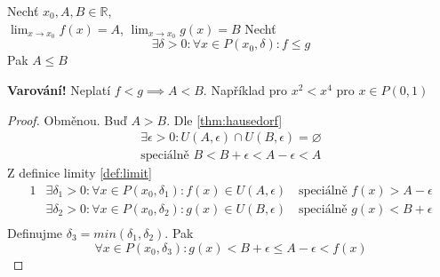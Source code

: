 \begin{theorem}
    Nechť $x_0, A, B\in\mathbb{R}$, \\
    $\lim_{x\to x_0}f(x)=A$, $\lim_{x\to x_0}g(x)=B$ Nechť
    \begin{equation}
        \exists\delta>0:\forall x\in P(x_0,\delta):f\leq g
    \end{equation}
    Pak $A\leq B$

    \textbf{Varování!} Neplatí $f<g\implies A<B$. Například pro $x^2<x^4 \text{ pro }x\in P(0,1)$
\end{theorem}
\begin{proof}
    Obměnou. Buď $A>B$. Dle \autoref{thm:hausedorf}
    \begin{gather}
        \exists\epsilon>0:U(A,\epsilon)\cap U(B,\epsilon)=\varnothing \\
        \text{speciálně }B<B+\epsilon<A-\epsilon<A
    \end{gather}
    Z definice limity \autoref{def:limit}
    \begin{alignat}{1}
        &\exists\delta_1>0:\forall x\in P(x_0,\delta_1):f(x)\in U(A,\epsilon)
            \quad\text{speciálně }f(x)>A-\epsilon \\
        &\exists\delta_2>0:\forall x\in P(x_0,\delta_2):g(x)\in U(B,\epsilon)
            \quad\text{speciálně }g(x)<B+\epsilon \\
    \end{alignat}
    Definujme $\delta_3=min(\delta_1,\delta_2)$. Pak
    \begin{equation}
        \forall x\in P(x_0,\delta_3):g(x)<B+\epsilon\leq A-\epsilon<f(x)
    \end{equation}
\end{proof}

